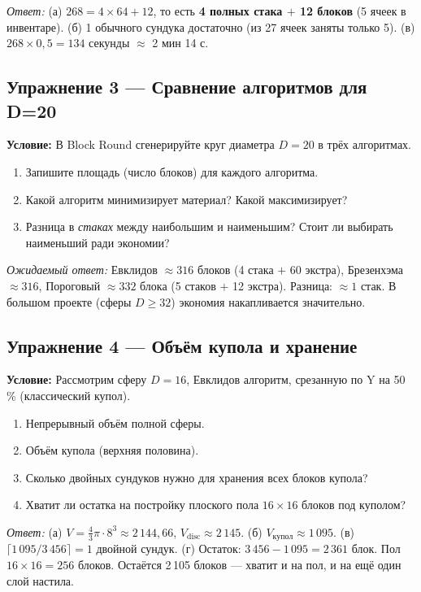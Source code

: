 \documentclass[12pt,a4paper]{scrartcl}
\newcommand{\acc}[1]{\textcolor{accent}{\textbf{#1}}}
\begin{document}
\emph{Ответ:} (а) $268 = 4 \times 64 + 12$, то есть \acc{4 полных стака $+$ 12 блоков} (5 ячеек в инвентаре). (б) 1 обычного сундука достаточно (из 27 ячеек заняты только 5). (в) $268 \times 0{,}5 = 134$ секунды $\approx$ 2 мин 14 с.

\subsection*{Упражнение 3 --- Сравнение алгоритмов для D=20}
\textbf{Условие:} В Block Round сгенерируйте круг диаметра $D = 20$ в трёх алгоритмах.
\begin{enumerate}[label=\alph*),leftmargin=1.5em,itemsep=0.1em,topsep=0.2em,nosep]
  \item Запишите площадь (число блоков) для каждого алгоритма.
  \item Какой алгоритм минимизирует материал? Какой максимизирует?
  \item Разница в \emph{стаках} между наибольшим и наименьшим? Стоит ли выбирать наименьший ради экономии?
\end{enumerate}

\emph{Ожидаемый ответ:} Евклидов $\approx 316$ блоков (4 стака $+$ 60 экстра), Брезенхэма $\approx 316$, Пороговый $\approx 332$ блока (5 стаков $+$ 12 экстра). Разница: $\approx 1$ стак. В большом проекте (сферы $D \geq 32$) экономия накапливается значительно.

\subsection*{Упражнение 4 --- Объём купола и хранение}
\textbf{Условие:} Рассмотрим сферу $D = 16$, Евклидов алгоритм, срезанную по Y на 50\,\% (классический купол).
\begin{enumerate}[label=\alph*),leftmargin=1.5em,itemsep=0.1em,topsep=0.2em,nosep]
  \item Непрерывный объём полной сферы.
  \item Объём купола (верхняя половина).
  \item Сколько двойных сундуков нужно для хранения всех блоков купола?
  \item Хватит ли остатка на постройку плоского пола $16 \times 16$ блоков под куполом?
\end{enumerate}

\emph{Ответ:}
(а) $V = \tfrac{4}{3}\pi \cdot 8^3 \approx 2\,144{,}66$, $V_{\mathrm{disc}} \approx 2\,145$. (б) $V_{\mathrm{купол}} \approx 1\,095$. (в) $\lceil 1\,095 / 3\,456 \rceil = 1$ двойной сундук. (г) Остаток: $3\,456 - 1\,095 = 2\,361$ блок. Пол $16 \times 16 = 256$ блоков. Остаётся 2\,105 блоков --- хватит и на пол, и на ещё один слой настила.
\end{document}
